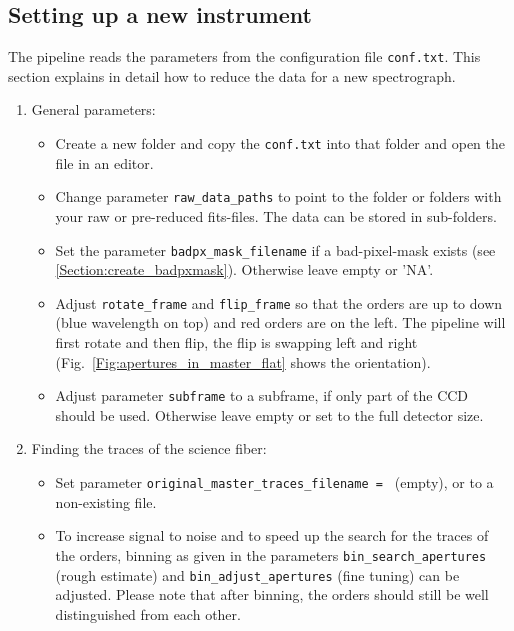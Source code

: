 \documentclass[10pt,a4paper]{article}
\begin{document}
\subsection{Setting up a new instrument}
\label{Section:first_configuration}
The pipeline reads the parameters from the configuration file \verb|conf.txt|. This section explains in detail how to reduce the data for a new spectrograph.

\begin{enumerate}
  \item General parameters: \vspace*{-\itemsep}
  \begin{itemize}[leftmargin=*]\setlength\itemsep{0em}
    \item Create a new folder and copy the \verb|conf.txt| into that folder and open the file in an editor.
    \item Change parameter \verb|raw_data_paths| to point to the folder or folders with your raw or pre-reduced fits-files. The data can be stored in sub-folders.
    \item Set the parameter \verb|badpx_mask_filename| if a bad-pixel-mask exists (see \ref{Section:create_badpxmask}). Otherwise leave empty or 'NA'.
    \item Adjust \verb|rotate_frame| and \verb|flip_frame| so that the orders are up to down (blue wavelength on top) and red orders are on the left. The pipeline will first rotate and then flip, the flip is swapping left and right (Fig.~\ref{Fig:apertures_in_master_flat} shows the orientation).
    \item Adjust parameter \verb|subframe| to a subframe, if only part of the CCD should be used. Otherwise leave empty or set to the full detector size.
  \end{itemize}
 
  \item Finding the traces of the science fiber: \vspace*{-\itemsep}
  \begin{itemize}[leftmargin=*]\setlength\itemsep{0em}
    \item Set parameter \verb|original_master_traces_filename = | (empty), or to a non-existing file.
    \item To increase signal to noise and to speed up the search for the traces of the orders, binning as given in the parameters \verb|bin_search_apertures| (rough estimate) and \verb|bin_adjust_apertures| (fine tuning) can be adjusted. Please note that after binning, the orders should still be well distinguished from each other. %
  \end{itemize}
  

\end{enumerate}
\end{document}
